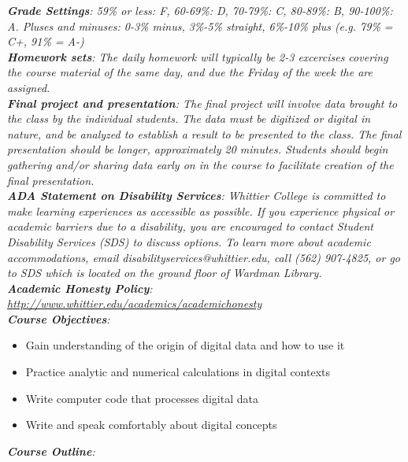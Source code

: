 \documentclass[10pt]{article}
\begin{document}
\textit{\textbf{Grade Settings}: 59\% or less: F, 60-69\%: D, 70-79\%: C, 80-89\%: B, 90-100\%: A.  Pluses and minuses: 0-3\% minus, 3\%-5\% straight, 6\%-10\% plus (e.g. 79\% = C+, 91\% = A-)} \\
\textit{\textbf{Homework sets}: The daily homework will typically be 2-3 excercises covering the course material of the same day, and due the Friday of the week the are assigned.} \\
\textit{\textbf{Final project and presentation}: The final project will involve data brought to the class by the individual students.  The data must be digitized or digital in nature, and be analyzed to establish a result to be presented to the class.  The final presentation should be longer, approximately 20 minutes.  Students should begin gathering and/or sharing data early on in the course to facilitate creation of the final presentation.} \\
\textit{\textbf{ADA Statement on Disability Services}: Whittier College is committed to make learning experiences as accessible as possible. If you experience physical or academic barriers due to a disability, you are encouraged to contact Student Disability Services (SDS) to discuss options. To learn more about academic accommodations, email disabilityservices@whittier.edu, call (562) 907-4825, or go to SDS which is located on the ground floor of Wardman Library.} \\
\textit{\textbf{Academic Honesty Policy}: \url{http://www.whittier.edu/academics/academichonesty}} \\
\textit{\textbf{Course Objectives}:}
\begin{itemize}
\item Gain understanding of the origin of digital data and how to use it
\item Practice analytic and numerical calculations in digital contexts
\item Write computer code that processes digital data
\item Write and speak comfortably about digital concepts
\end{itemize}
\clearpage
\textit{\textbf{Course Outline}:}
\end{document}
